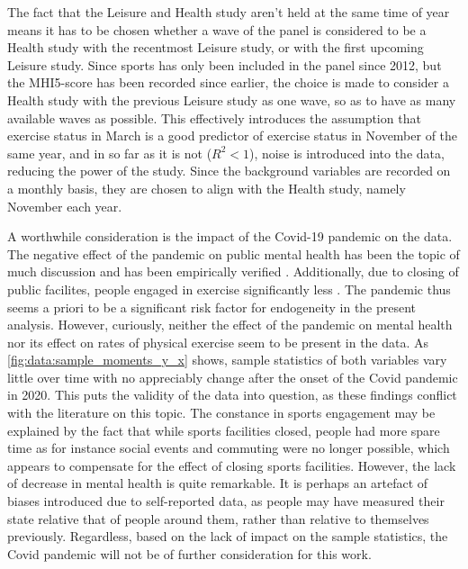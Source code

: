 The fact that the Leisure and Health study aren't held at the same time of year means it has to be chosen whether
a wave of the panel is considered to be a Health study with the recentmost Leisure study, or with the first upcoming
Leisure study. Since sports has only been included in the panel since 2012, but the MHI5-score has been
recorded since earlier, the choice is made to consider a Health study with the previous Leisure study as one wave,
so as to have as many available waves as possible. This effectively introduces the assumption that exercise status
in March is a good predictor of exercise status in November of the same year, and in so far as it is not ($R^2 < 1$),
noise is introduced into the data, reducing the power of the study.
Since the background variables are recorded on a monthly basis, they are chosen to align with the Health study,
namely November each year.

A worthwhile consideration is the impact of the Covid-19 pandemic on the data. The negative effect of the pandemic on public
mental health has been the topic of much discussion \cite{cullen2020mental,kumar2021covid} and has been empirically verified \cite{kupcova2023effects}.
Additionally, due to closing of public facilites, people engaged in exercise significantly less \cite{amini2021covid}.
The pandemic thus seems a priori to be a significant risk factor for endogeneity in the present analysis.
However, curiously, neither the effect of the pandemic on mental health nor its effect on rates of physical exercise
seem to be present in the data. As \cref{fig:data:sample_moments_y_x} shows, sample statistics of both variables
vary little over time with no appreciably change after the onset of the Covid pandemic in 2020.
This puts the validity of the data into question, as these findings conflict with the literature on this topic.
The constance in sports engagement may be explained by the fact that while sports facilities closed, people had more spare time
as for instance social events and commuting were no longer possible, which appears to compensate for the effect of
closing sports facilities.
However, the lack of decrease in mental health is quite remarkable. It is perhaps an artefact of biases introduced
due to self-reported data, as people may have measured their state relative that of people around them, rather than
relative to themselves previously.
Regardless, based on the lack of impact on the sample statistics, the Covid pandemic will not be of further consideration
for this work.


